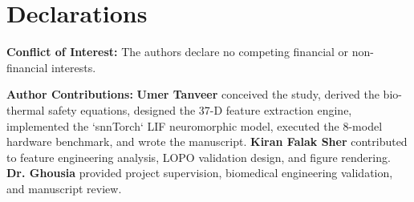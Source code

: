 \documentclass[pdflatex,sn-mathphys-num]{sn-jnl}%
\begin{document}
\section{Declarations}\label{sec_decl}
\textbf{Conflict of Interest:} The authors declare no competing financial or non-financial interests.

\textbf{Author Contributions:} \textbf{Umer Tanveer} conceived the study, derived the bio-thermal safety equations, designed the 37-D feature extraction engine, implemented the `snnTorch` LIF neuromorphic model, executed the 8-model hardware benchmark, and wrote the manuscript. \textbf{Kiran Falak Sher} contributed to feature engineering analysis, LOPO validation design, and figure rendering. \textbf{Dr. Ghousia} provided project supervision, biomedical engineering validation, and manuscript review.


\end{document}
